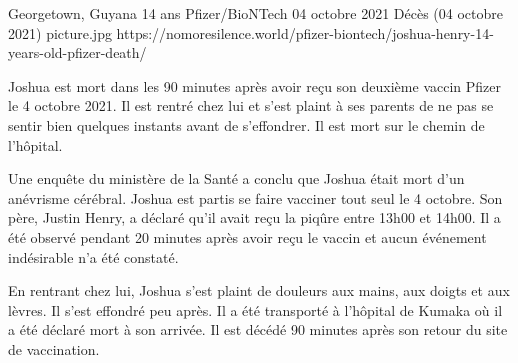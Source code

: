 {Georgetown, Guyana}
{14 ans}
{Pfizer/BioNTech}
{04 octobre 2021}
{Décès (04 octobre 2021)}
{picture.jpg}
{https://nomoresilence.world/pfizer-biontech/joshua-henry-14-years-old-pfizer-death/}
{

Joshua est mort dans les 90 minutes après avoir reçu son deuxième vaccin Pfizer
le 4 octobre 2021. Il est rentré chez lui et s'est plaint à ses parents de ne
pas se sentir bien quelques instants avant de s'effondrer. Il est mort sur le
chemin de l'hôpital.

Une enquête du ministère de la Santé a conclu que Joshua était mort d'un
anévrisme cérébral. Joshua est partis se faire vacciner tout seul le 4
octobre. Son père, Justin Henry, a déclaré qu'il avait reçu la piqûre entre
13h00 et 14h00. Il a été observé pendant 20 minutes après avoir reçu le vaccin
et aucun événement indésirable n'a été constaté.

En rentrant chez lui, Joshua s'est plaint de douleurs aux mains, aux doigts et
aux lèvres. Il s'est effondré peu après. Il a été transporté à l'hôpital de
Kumaka où il a été déclaré mort à son arrivée. Il est décédé 90 minutes après
son retour du site de vaccination.

}
